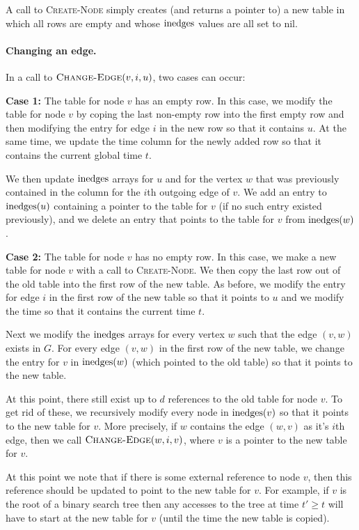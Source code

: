 A call to \textsc{Create-Node} simply creates (and returns a pointer
to) a new table in which all rows are empty and whose $\mathrm{inedges}$ values
are all set to nil.

\paragraph{Changing an edge.}

In a call to $\textsc{Change-Edge}(v,i,u)$, two cases can occur:

\noindent\textbf{Case 1:} The table for node $v$ has an empty row.  
In this case, we modify the table for node $v$ by coping the last
non-empty row into the first empty row and then modifying the entry
for edge $i$ in the new row so that it contains $u$.  At the same time,
we update the time column for the newly added row so that it contains
the current global time $t$.

We then update $\mathrm{inedges}$ arrays for $u$ and for the vertex $w$ that was
previously contained in the column for the $i$th outgoing edge of $v$.
We add an entry to $\mathrm{inedges}(u)$ containing a pointer to the table for
$v$ (if no such entry existed previously), and we delete an entry that
points to the table for $v$ from $\mathrm{inedges}(w)$.

\noindent\textbf{Case 2:} The table for node $v$ has no empty row.  In
this case, we make a new table for node $v$ with a call to
\textsc{Create-Node}.  We then copy the last row out of the old table into
the first row of the new table.  As before, we modify the entry for
edge $i$ in the first row of the new table so that it points to $u$
and we modify the time so that it contains the current time $t$.

Next we modify the $\mathrm{inedges}$ arrays for every vertex $w$ such that the
edge $(v,w)$ exists in $G$.  For every edge $(v,w)$ in the first row
of the new table, we change the entry for $v$ in $\mathrm{inedges}(w)$ (which
pointed to the old table) so that it points to the new table.

At this point, there still exist up to $d$ references to the old table
for node $v$.  To get rid of these, we recursively modify every node
in $\mathrm{inedges}(v)$ so that it points to the new table for $v$.  More
precisely, if $w$ contains the edge $(w,v)$ as it's $i$th edge, then
we call $\textsc{Change-Edge}(w,i,v)$, where $v$ is a pointer to the
new table for $v$.

At this point we note that if there is some external reference to node
$v$, then this reference should be updated to point to the new table
for $v$.  For example, if $v$ is the root of a binary search tree then
any accesses to the tree at time $t'\ge t$ will have to start at the
new table for $v$ (until the time the new table is copied).


